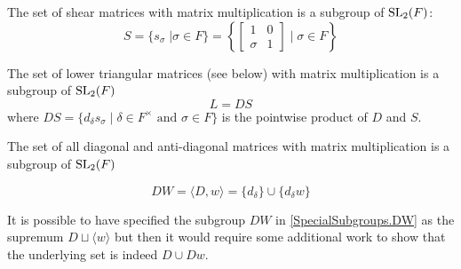 \begin{definition}
\label{SpecialSubgroups.S}
\leanok
    The set of shear matrices with matrix multiplication is a subgroup of $\operatorname{SL}_2(F)$:
    \[
    S = \{s_\sigma \; | \sigma \in F\} = \left\{\begin{bmatrix}1 & 0\\ \sigma & 1\end{bmatrix} \; | \; \sigma \in F \right\}
    \]
\end{definition}


\begin{definition}
\label{SpecialSubgroups.L}
\leanok
    The set of lower triangular matrices (see below) with matrix multiplication is a subgroup of $\operatorname{SL}_2(F)$
    \[
    L = DS
    \]
    where $DS = \{d_\delta s_\sigma \; | \; \delta \in F^\times \text{ and } \sigma \in F \}$ is the pointwise product of $D$ and $S$.
\end{definition}


\begin{definition}
    \label{SpecialSubgroups.DW}
    \leanok
    The set of all diagonal and anti-diagonal matrices with matrix multiplication is a subgroup of $\operatorname{SL}_2(F)$

    \begin{equation}\label{antidiag} DW = \langle D, w\rangle  = \{d_\delta \} \cup \{ d_\delta w \} 
    \end{equation}
\end{definition}


\begin{remark}
    It is possible to have specified the subgroup $DW$ in \ref{SpecialSubgroups.DW} as the supremum $D \sqcup \langle w \rangle$
    but then it would require some additional work to show that the underlying set is indeed $D \cup Dw$.
\end{remark}


